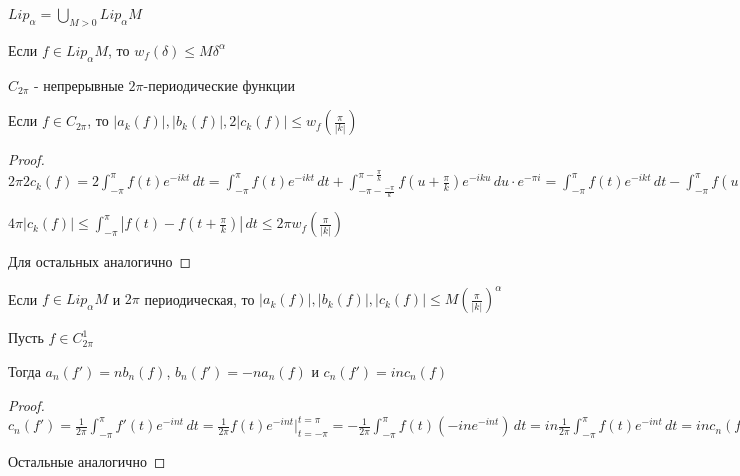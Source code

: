 \begin{definition}
    $Lip_\alpha = \bigcup\limits_{M > 0} Lip_\alpha M$
\end{definition}

\begin{remark}
    Если $f \in Lip_\alpha M$, то $w_f (\delta) \leqslant M \delta^\alpha$
\end{remark}

$C_{2\pi}$ - непрерывные $2\pi$-периодические функции

\begin{theorem}
    Если $f \in C_{2\pi}$, то $|a_k (f)|, |b_k (f)|, 2|c_k (f)| \leqslant w_f (\frac{\pi}{|k|})$
\end{theorem}

\begin{proof}
    $2\pi 2c_k (f) = 2 \int_{-\pi}^\pi f(t) e^{-ikt} \, dt = \int_{-\pi}^\pi f(t) e^{-ikt} \, dt + \int_{-\pi - \frac{-\pi}{k}}^{\pi - \frac{\pi}{k}} f(u + \frac{\pi}{k}) e^{-iku} \, du \cdot e^{-\pi i} = 
    \int_{-\pi}^\pi f(t) e^{-ikt} \, dt - \int_{-\pi}^{\pi} f(u + \frac{\pi}{k}) e^{-iku} \, du = \int_{-\pi}^\pi (f(t) - f(t + \frac{\pi}{k})) e^{-ikt} \, dt$

    $4\pi |c_k (f)| \leqslant \int_{-\pi}^\pi |f(t) - f(t + \frac{\pi}{k})| \, dt \leqslant 2\pi w_f (\frac{\pi}{|k|})$

    Для остальных аналогично
\end{proof}

\begin{consequence}
    Если $f \in Lip_\alpha M$ и $2\pi$ периодическая, то
    $|a_k (f)|, |b_k(f) |, | c_k(f) | \leqslant M \left (\frac{\pi}{|k|} \right )^\alpha$
\end{consequence}

\begin{lemma}
    Пусть $f \in C_{2\pi}^1$

    Тогда $a_n (f') = n b_n (f)$, $b_n (f') = -n a_n (f)$ и $c_n (f') = in c_n (f)$
\end{lemma}

\begin{proof}
    $c_n (f') = \frac{1}{2\pi} \int_{-\pi}^\pi f'(t) e^{-int} \, dt = \frac{1}{2\pi} f(t) e^{-int} \bigg |_{t = -\pi}^{t = \pi} = -\frac{1}{2\pi} \int_{-\pi}^\pi f (t) (-ine^{-int}) \, dt = 
    in \frac{1}{2\pi} \int_{-\pi}^\pi f(t) e^{-int} \, dt = in c_n (f)$

    Остальные аналогично
\end{proof}

